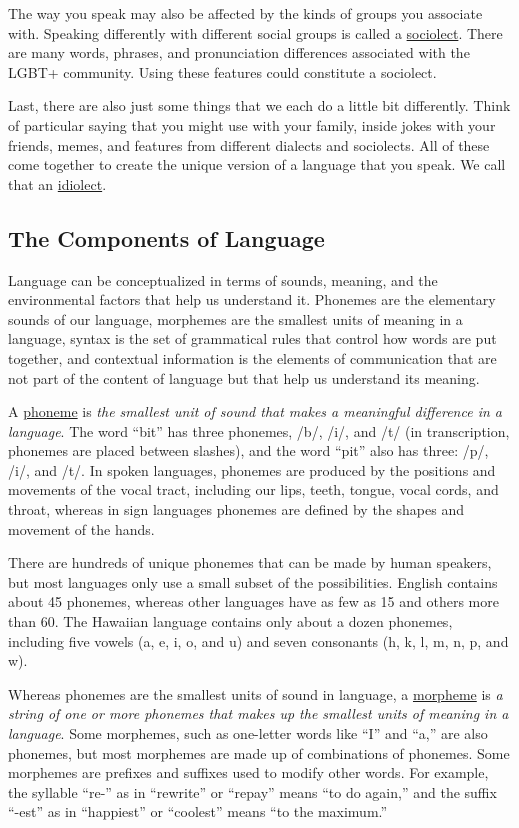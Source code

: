 \documentclass[
]{krantz}
\begin{document}
The way you speak may also be affected by the kinds of groups you associate with. Speaking differently with different social groups is called a \hyperref[sociolect]{sociolect}. There are many words, phrases, and pronunciation differences associated with the LGBT+ community. Using these features could constitute a sociolect.

Last, there are also just some things that we each do a little bit differently. Think of particular saying that you might use with your family, inside jokes with your friends, memes, and features from different dialects and sociolects. All of these come together to create the unique version of a language that you speak. We call that an \hyperref[idiolect]{idiolect}.

\subsection*{The Components of Language}\label{the-components-of-language}


Language can be conceptualized in terms of sounds, meaning, and the environmental factors that help us understand it. Phonemes are the elementary sounds of our language, morphemes are the smallest units of meaning in a language, syntax is the set of grammatical rules that control how words are put together, and contextual information is the elements of communication that are not part of the content of language but that help us understand its meaning.

A \hyperref[phoneme]{phoneme} is \emph{the smallest unit of sound that makes a meaningful difference in a language}. The word ``bit'' has three phonemes, /b/, /i/, and /t/ (in transcription, phonemes are placed between slashes), and the word ``pit'' also has three: /p/, /i/, and /t/. In spoken languages, phonemes are produced by the positions and movements of the vocal tract, including our lips, teeth, tongue, vocal cords, and throat, whereas in sign languages phonemes are defined by the shapes and movement of the hands.

There are hundreds of unique phonemes that can be made by human speakers, but most languages only use a small subset of the possibilities. English contains about 45 phonemes, whereas other languages have as few as 15 and others more than 60. The Hawaiian language contains only about a dozen phonemes, including five vowels (a, e, i, o, and u) and seven consonants (h, k, l, m, n, p, and w).

Whereas phonemes are the smallest units of sound in language, a \hyperref[morpheme]{morpheme} is \emph{a string of one or more phonemes that makes up the smallest units of meaning in a language}. Some morphemes, such as one-letter words like ``I'' and ``a,'' are also phonemes, but most morphemes are made up of combinations of phonemes. Some morphemes are prefixes and suffixes used to modify other words. For example, the syllable ``re-'' as in ``rewrite'' or ``repay'' means ``to do again,'' and the suffix ``-est'' as in ``happiest'' or ``coolest'' means ``to the maximum.''
\end{document}
